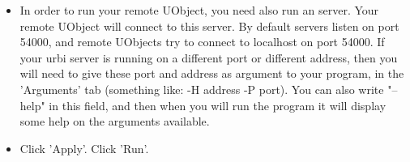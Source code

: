 \begin{itemize}
\item In order to run your remote UObject, you need also run an \urbi server. Your remote UObject
will connect to this \urbi server. By default \urbi servers listen on port 54000, and remote UObjects
try to connect to localhost on port 54000. If your urbi server is running on a different port or different
address, then you will need to give these port and address as argument to your program, in the 'Arguments'
tab (something like: -H address -P port). You can also write "--help" in this field, and then when you will
run the program it will display some help on the arguments available.

\item Click 'Apply'. Click 'Run'.

\end{itemize}

